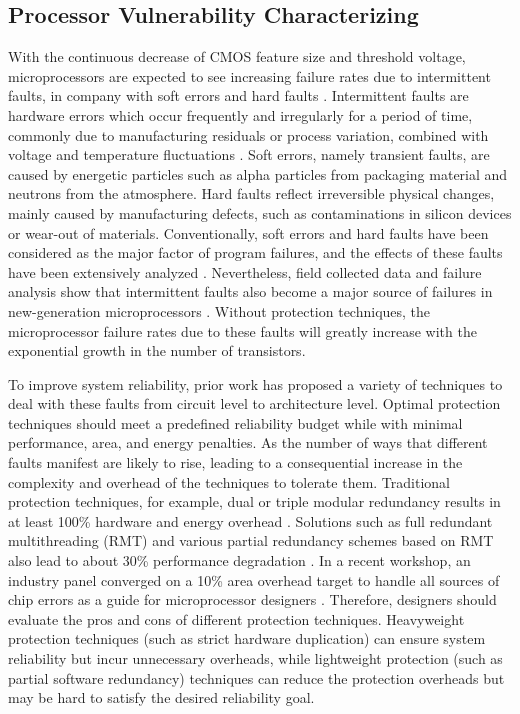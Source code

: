 \subsection{Processor Vulnerability Characterizing}
With the continuous decrease of CMOS feature size and threshold voltage, microprocessors are expected to see increasing failure rates due to intermittent faults, in company with soft errors and hard faults \cite{mcpherson2006reliability} \cite{constantinescu2003trends} \cite{karnik2004characterization}. Intermittent faults are hardware errors which occur frequently and irregularly for a period of time, commonly due to manufacturing residuals or process variation, combined with voltage and temperature fluctuations \cite{constantinescu2002impact} \cite{wells2008adapting}. Soft errors, namely transient faults, are caused by energetic particles such as alpha particles from packaging material and neutrons from the atmosphere. Hard faults reflect irreversible physical changes, mainly caused by manufacturing defects, such as contaminations in silicon devices or wear-out of materials. Conventionally, soft errors and hard faults have been considered as the major factor of program failures, and the effects of these faults have been extensively analyzed \cite{Shivakumar_DSN02} \cite{gupta1991impact}. Nevertheless, field collected data and failure analysis show that intermittent faults also become a major source of failures in new-generation microprocessors \cite{constantinescu2008intermittent}. Without protection techniques, the microprocessor failure rates due to these faults will greatly increase with the exponential growth in the number of transistors.

To improve system reliability, prior work has proposed a variety of techniques to deal with these faults from circuit level to architecture level. Optimal protection techniques should meet a predefined reliability budget while with minimal performance, area, and energy penalties. As the number of ways that different faults manifest are likely to rise, leading to a consequential increase in the complexity and overhead of the techniques to tolerate them. Traditional protection techniques, for example, dual or triple modular redundancy results in at least 100\% hardware and energy overhead \cite{Slegel1999IBM} \cite{wood1999data}. Solutions such as full redundant multithreading (RMT) and various partial redundancy schemes based on RMT also lead to about 30\% performance degradation \cite{mukherjee2002detailed} \cite{reinhardt2000transient} \cite{parashar2006slick} \cite{shyam2006ultra}. In a recent workshop, an industry panel converged on a 10\% area overhead target to handle all sources of chip errors as a guide for microprocessor designers \cite{li2008understanding}. Therefore, designers should evaluate the pros and cons of different protection techniques. Heavyweight protection techniques (such as strict hardware duplication) can ensure system reliability but incur unnecessary overheads, while lightweight protection (such as partial software redundancy) techniques can reduce the protection overheads but may be hard to satisfy the desired reliability goal.


